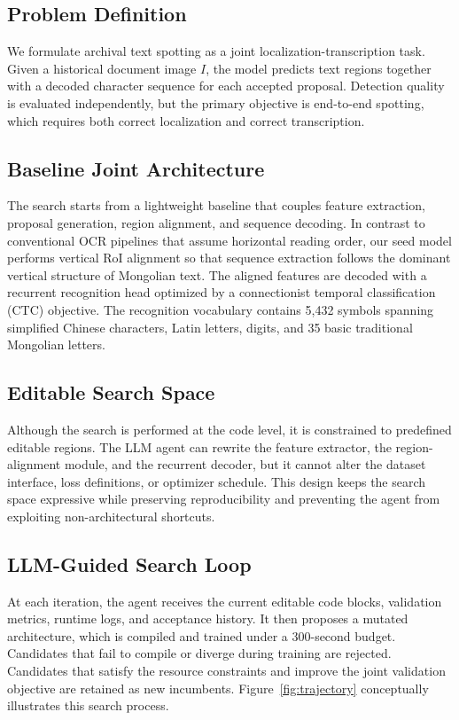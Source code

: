 \documentclass[a4paper,fleqn,longmktitle]{cas-sc}
\begin{document}
\subsection{Problem Definition}

We formulate archival text spotting as a joint localization-transcription task. Given a historical document image $I$, the model predicts text regions together with a decoded character sequence for each accepted proposal. Detection quality is evaluated independently, but the primary objective is end-to-end spotting, which requires both correct localization and correct transcription.

\subsection{Baseline Joint Architecture}

The search starts from a lightweight baseline that couples feature extraction, proposal generation, region alignment, and sequence decoding. In contrast to conventional OCR pipelines that assume horizontal reading order, our seed model performs vertical RoI alignment so that sequence extraction follows the dominant vertical structure of Mongolian text. The aligned features are decoded with a recurrent recognition head optimized by a connectionist temporal classification (CTC) objective. The recognition vocabulary contains 5,432 symbols spanning simplified Chinese characters, Latin letters, digits, and 35 basic traditional Mongolian letters.

\subsection{Editable Search Space}

Although the search is performed at the code level, it is constrained to predefined editable regions. The LLM agent can rewrite the feature extractor, the region-alignment module, and the recurrent decoder, but it cannot alter the dataset interface, loss definitions, or optimizer schedule. This design keeps the search space expressive while preserving reproducibility and preventing the agent from exploiting non-architectural shortcuts.

\subsection{LLM-Guided Search Loop}

At each iteration, the agent receives the current editable code blocks, validation metrics, runtime logs, and acceptance history. It then proposes a mutated architecture, which is compiled and trained under a 300-second budget. Candidates that fail to compile or diverge during training are rejected. Candidates that satisfy the resource constraints and improve the joint validation objective are retained as new incumbents. Figure~\ref{fig:trajectory} conceptually illustrates this search process.
\end{document}
